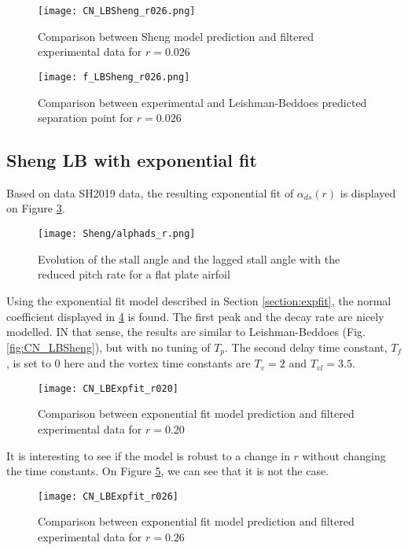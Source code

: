 \begin{figure}[h]
    \centering
    \texttt{[image: CN\_LBSheng\_r026.png]}
    \caption{Comparison between Sheng model prediction and filtered experimental data for $r = 0.026$}
    \label{fig:CN_LBSheng_r026}
\end{figure}

\begin{figure}[h]
    \centering
    \texttt{[image: f\_LBSheng\_r026.png]}
    \caption{Comparison between experimental and Leishman-Beddoes predicted separation point for $r = 0.026$}
    \label{fig:f_LBSheng_r026}
\end{figure}


\subsection{Sheng LB with exponential fit}

Based on data SH2019 data, the resulting exponential fit of $\alpha_{ds}(r)$ is displayed on Figure \ref{fig:expfit}.

\begin{figure}[h]
    \centering
    \texttt{[image: Sheng/alphads\_r.png]} 
    \caption{Evolution of the stall angle and the lagged stall angle with the reduced pitch rate for a flat plate airfoil}
    \label{fig:expfit}
\end{figure}

Using the exponential fit model described in Section \ref{section:expfit}, the normal coefficient displayed in \ref{fig:CN_LBExpfit_r020} is found. The first peak and the decay rate are nicely modelled. IN that sense, the results are similar to Leishman-Beddoes (Fig. \ref{fig:CN_LBSheng}), but with no tuning of $T_p$. The second delay time constant, $T_f$, is set to 0 here and the vortex time constants are $T_v=2$ and $T_{vl}=3.5$.

\begin{figure}[h]
    \centering
    \texttt{[image: CN\_LBExpfit\_r020]}
    \caption{Comparison between exponential fit model prediction and filtered experimental data for $r=0.20$}
    \label{fig:CN_LBExpfit_r020}
\end{figure}

It is interesting to see if the model is robust to a change in $r$ without changing the time constants. On Figure \ref{fig:CN_LBExpfit_r026}, we can see that it is not the case. 

\begin{figure}[h]
    \centering
    \texttt{[image: CN\_LBExpfit\_r026]}
    \caption{Comparison between exponential fit model prediction and filtered experimental data for $r=0.26$}
    \label{fig:CN_LBExpfit_r026}
\end{figure}